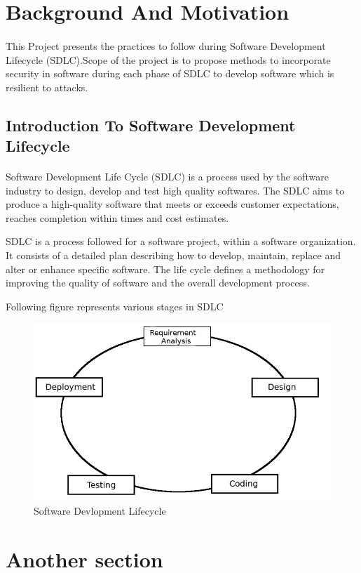 \documentclass[12pt]{report}
\begin{document}
\section{Background And Motivation}


\paragraph{ }
This Project presents the practices to follow during Software Development Lifecycle (SDLC).Scope of the project is to propose methods to incorporate security in software during each phase of SDLC to develop software which is resilient to attacks.

\subsection{Introduction To Software Development Lifecycle}
\paragraph{ }
Software Development Life Cycle (SDLC) is a process used by the software industry to design, develop and test high quality softwares. The SDLC aims to produce a high-quality software that meets or exceeds customer expectations, reaches completion within times and cost estimates.\par
    SDLC is a process followed for a software project, within a software organization. It consists of a detailed plan describing how to develop, maintain, replace and alter or enhance specific software. The life cycle defines a methodology for improving the quality of software and the overall development process.\par
    Following figure represents various stages in SDLC\\
\begin{figure}[h!]
	\begin{center}
		\includegraphics[scale =0.4]{images/sdlc.png}
		\caption{Software Devlopment Lifecycle}
		\label{sdlc}
	\end{center}
\end{figure}


\section{Another section}
\end{document}

